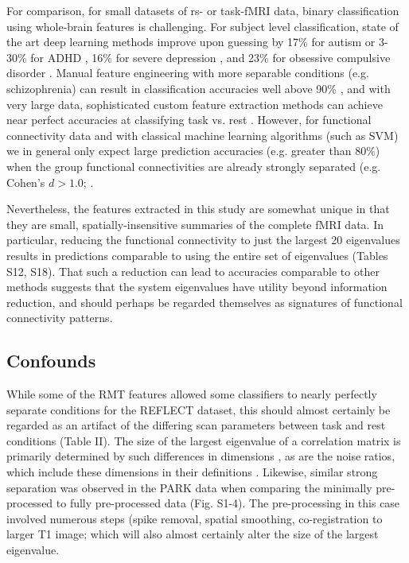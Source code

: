 \documentclass[NETN,manuscript]{stjour-new}
\begin{document}
For comparison, for small datasets of rs- or task-fMRI data, binary classification using whole-brain
features is challenging. For subject level classification, state of the art deep learning methods
improve upon guessing by 17\% for autism \citep{bengs4DSpatioTemporalDeep2020} or 3-30\% for ADHD
\citep{riazDeepFMRIEndtoendDeep2020}, 16\% for severe depression
\citep{ramasubbuAccuracyAutomatedClassification2016}, and 23\% for obsessive compulsive disorder
\citep{takagiNeuralMarkerObsessiveCompulsive2017}. Manual feature engineering with more separable
conditions (e.g. schizophrenia) can result in classification accuracies well above 90\%
\citep{duHighClassificationAccuracy2012}, and with very large data, sophisticated custom feature
extraction methods can achieve near perfect accuracies at classifying task vs. rest
\citep{zhangCharacterizingDifferentiatingTaskbased2016}. However, for functional connectivity data
and with classical machine learning algorithms (such as SVM) we in general only expect large
prediction accuracies (e.g. greater than 80\%) when the group functional connectivities are already
strongly separated (e.g. Cohen’s \(d > 1.0\); \cite{dansereauStatisticalPowerPrediction2017}.

Nevertheless, the features extracted in this study are somewhat unique in that they are small,
spatially-insensitive summaries of the complete fMRI data. In particular, reducing the functional
connectivity to just the largest 20 eigenvalues results in predictions comparable to using the
entire set of eigenvalues (Tables S12, S18). That such a reduction can lead to accuracies comparable
to other methods suggests that the system eigenvalues have utility beyond information reduction, and
should perhaps be regarded themselves as signatures of functional connectivity patterns.

\subsection{Confounds}
While some of the RMT features allowed some classifiers to nearly perfectly separate conditions for
the REFLECT dataset, this should almost certainly be regarded as an artifact of the differing scan
parameters between task and rest conditions (Table II). The size of the largest eigenvalue of a
correlation matrix is primarily determined by such differences in dimensions
\citep{yinLimitLargestEigenvalue1988}, as are the noise ratios, which include these dimensions in
their definitions \citep{veraartDiffusionMRINoise2016,veraartDenoisingDiffusionMRI2016}. Likewise,
similar strong separation was observed in the PARK data when comparing the minimally pre-processed
to fully pre-processed data (Fig. S1-4). The pre-processing in this case involved numerous steps
(spike removal, spatial smoothing, co-registration to larger T1 image;
\cite{madhyasthaDynamicConnectivityRest2015} which will also almost certainly alter the size of the
largest eigenvalue.
\end{document}

